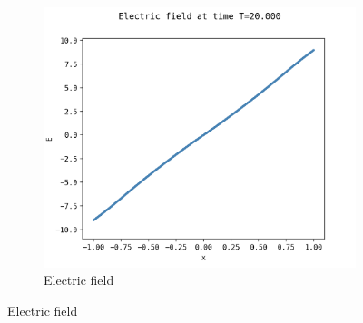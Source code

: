 \documentclass{article}
\numberwithin{equation}{section}
\newcommand{\imh}{\textheight} %
\newcommand{\imw}{\textwidth} %
\begin{document}
\begin{figure}
\begin{subfigure}{\textwidth}
		\includegraphics[height=\imh,width=\imw]{images/ET20_512_2.png}
		\caption{Electric field }
		\label{subfig:compT02_E}
	\end{subfigure}


\end{figure}
\end{document}
